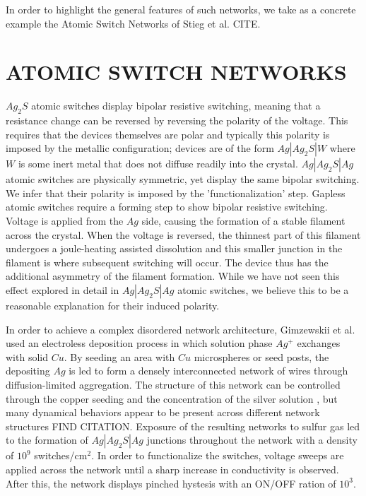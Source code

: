 \documentclass[aps,prl,preprint,groupedaddress]{revtex4-1}
\begin{document}
In order to highlight the general features of such networks, we take as
a concrete example the Atomic Switch Networks of Stieg et al. CITE.


\section{ATOMIC SWITCH NETWORKS}


$Ag_2 S$ atomic switches display bipolar resistive switching, meaning that
a resistance change can be reversed by reversing the polarity of the voltage.
This requires that the devices themselves are polar and typically this
polarity is imposed by the metallic configuration; devices are of the form
$Ag|Ag_2 S|W$ where $W$ is some inert metal that does not diffuse readily into
the crystal.  $Ag|Ag_2 S| Ag$ atomic switches are physically symmetric, yet
display the same bipolar switching.  We infer that their polarity is imposed
by the
'functionalization' step.  Gapless atomic switches require a forming step
to show bipolar resistive switching.  Voltage is applied from the $Ag$ side,
causing the formation of a stable filament across the crystal.  When the
voltage is reversed, the thinnest part of this filament undergoes a 
joule-heating assisted dissolution \cite{Hasegawa2012} and this smaller
junction in the filament is where subsequent switching will occur.  The device
thus has the additional asymmetry of the filament formation.  While we have
not seen this effect explored in detail in $Ag|Ag_2 S |Ag$ atomic switches,
we believe this to be a reasonable explanation for their induced polarity.

In order to achieve a complex disordered network architecture, Gimzewskii et
al. used an electroless deposition process in which solution phase $Ag^+$
exchanges with solid $Cu$.  By seeding an area with $Cu$ 
microspheres or seed posts, the depositing $Ag$ is led to form a
densely interconnected network of wires through diffusion-limited aggregation.
The structure of this network can be controlled through the copper
seeding and the concentration of the silver solution \cite{Avizienis2013},
but many dynamical behaviors appear to be present across different network
structures FIND CITATION.  Exposure of the resulting networks to sulfur gas
led to the formation of $Ag|Ag_2 S|Ag$ junctions throughout the network with
a density of $10^9$ switches/cm$^2$.  In order to functionalize the switches,
voltage sweeps are applied across the network until a sharp increase
in conductivity is observed.  After this, the network displays pinched
hystesis with an ON/OFF ration of $10^3$.
\end{document}
